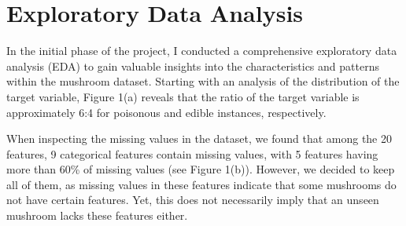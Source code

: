 \documentclass{article}
\begin{document}
\section{Exploratory Data Analysis}
\hspace{0.5cm} In the initial phase of the project, I conducted a comprehensive exploratory data analysis (EDA) to gain valuable insights into the characteristics and patterns within the mushroom dataset. Starting with an analysis of the distribution of the target variable, Figure 1(a) reveals that the ratio of the target variable is approximately 6:4 for poisonous and edible instances, respectively. 

When inspecting the missing values in the dataset, we found that among the 20 features, 9 categorical features contain missing values, with 5 features having more than 60\% of missing values (see Figure 1(b)). However, we decided to keep all of them, as missing values in these features indicate that some mushrooms do not have certain features. Yet, this does not necessarily imply that an unseen mushroom lacks these features either.
\end{document}
